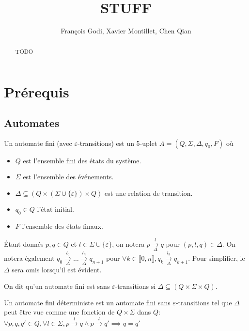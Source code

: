 \documentclass[10pt,a4paper]{article}
\newcommand{\enum}[2]{\llbracket #1, #2 \rrbracket}
\begin{document}
    \title{STUFF}

    \author{François Godi, Xavier Montillet, Chen Qian}

\maketitle

\begin{abstract}
TODO
\end{abstract}

\section{Pr\'erequis}

\subsection{Automates}

Un automate fini (avec $\varepsilon$-transitions) est un 5-uplet $A = (Q, \Sigma, \Delta, q_0, F)$ o\`u
\begin{itemize}
	\item $Q$ est l'ensemble fini des états du système.
	\item $\Sigma$ est l'ensemble des événements.
	\item $\Delta \subseteq (Q \times (\Sigma \cup \{\varepsilon\}) \times Q)$ est une relation de transition.
	\item $q_0 \in Q$ l'état initial.
	\item $F$ l'ensemble des \'etats finaux.
\end{itemize}

\'Etant donn\'es $p,q \in Q$ et $l\in \Sigma \cup \{\varepsilon\}$, on notera $p \underset{\Delta}{\overset{l}{{\to}}}q$ pour $(p,l,q) \in \Delta$. On notera \'egalement $q_0 \underset{\Delta}{\overset{l_0}{{\to}}} \dots \underset{\Delta}{\overset{l_n}{{\to}}} q_{n+1}$ pour $\forall k \in \enum{0}{n}, q_k 
\underset{\Delta}{\overset{l_k}{{\to}}} q_{k+1}$. Pour simplifier, le $\Delta$ sera omis lorsqu'il est \'evident.



On dit qu'un automate fini est sans $\varepsilon$-transitions si $\Delta \subseteq (Q\times \Sigma \times Q)$.

Un automate fini d\'eterministe est un automate fini sans $\varepsilon$-transitions tel que $\Delta$ peut \^etre vue comme une fonction de $Q\times \Sigma$ dans $Q$: $\forall p,q,q' \in Q, \forall l \in \Sigma, p\overset{l}{{\to}}q \land p\overset{l}{{\to}}q' \implies q=q'$
\end{document}
